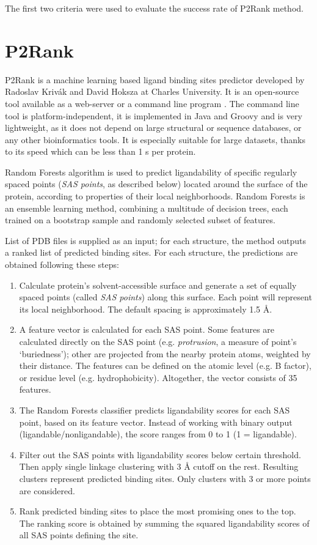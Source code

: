 The first two criteria were used to evaluate the success rate of P2Rank method.

\section{P2Rank} \label{s:p2rank}

P2Rank \cite{p2rank1} is a machine learning based ligand binding sites predictor developed by Radoslav Krivák and David Hoksza at Charles University. It is an open-source tool available as a web-server or a command line program \cite{prankweb}. The command line tool is platform-independent, it is implemented in Java and Groovy and is very lightweight, as it does not depend on large structural or sequence databases, or any other bioinformatics tools. It is especially suitable for large datasets, thanks to its speed which can be less than 1 s per protein. 

Random Forests algorithm \cite{randomforests} is used to predict ligandability of specific regularly spaced points (\textit{SAS points}, as described below) located around the surface of the protein, according to properties of their local neighborhoods. Random Forests is an ensemble learning method, combining a multitude of decision trees, each trained on a bootstrap sample and randomly selected subset of features.

List of PDB files is supplied as an input; for each structure, the method outputs a ranked list of predicted binding sites. For each structure, the predictions are obtained following these steps: \cite{p2rank1, p2rank2}

\begin{enumerate}
\item Calculate protein's solvent-accessible surface \cite{shrake} and generate a set of equally spaced points (called \textit{SAS points}) along this surface. Each point will represent its local neighborhood. The default spacing is approximately 1.5 {\AA}. 
\item A feature vector is calculated for each SAS point. Some features are calculated directly on the SAS point (e.g. \textit{protrusion}, a measure of point's `buriedness'); other are projected from the nearby protein atoms, weighted by their distance. The features can be defined on the atomic level (e.g. B factor), or residue level (e.g. hydrophobicity). Altogether, the vector consists of 35 features.
\item The Random Forests classifier predicts ligandability scores for each SAS point, based on its feature vector. Instead of working with binary output (ligandable/nonligandable), the score ranges from 0 to 1 (1 = ligandable).
\item Filter out the SAS points with ligandability scores below certain threshold. Then apply single linkage clustering with 3 {\AA} cutoff on the rest. Resulting clusters represent predicted binding sites. Only clusters with 3 or more points are considered.
\item Rank predicted binding sites to place the most promising ones to the top. The ranking score is obtained by summing the squared ligandability scores of all SAS points defining the site.
\end{enumerate}

